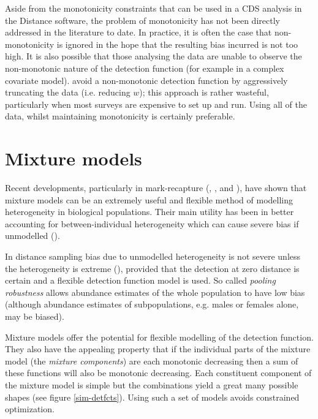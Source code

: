 \label{cor-7s14}Aside from the monotonicity constraints that can be used in a CDS analysis in the Distance software, the problem of monotonicity has not been directly addressed in the literature to date. In practice, it is often the case that non-monotonicity is ignored in the hope that the resulting bias incurred is not too high. It is also possible that those analysing the data are unable to observe the non-monotonic nature of the detection function (for example in a complex covariate model).  avoid a non-monotonic detection function by aggressively truncating the data (i.e. reducing $w$); this approach is rather wasteful, particularly when most surveys are expensive to set up and run. Using all of the data, whilst maintaining monotonicity is certainly preferable.

\section{Mixture models}

Recent developments, particularly in mark-recapture (\cite{pledger2000}, \cite{dorazio03}, \cite{pledger2005} and \cite{morgan08}), have shown that mixture models can be an extremely useful and flexible method of modelling heterogeneity in biological populations. Their main utility has been in better accounting for between-individual heterogeneity which can cause severe bias if unmodelled (\cite{Link2003}). 

In distance sampling bias due to unmodelled heterogeneity is not severe unless the heterogeneity is extreme (\cite[pp. 389-392]{ADS}), provided that the detection at zero distance is certain and a flexible detection function model is used. So called \textit{pooling robustness} allows abundance estimates of the whole population to have low bias (although abundance estimates of subpopulations, e.g. males or females alone, may be biased). 

Mixture models offer the potential for flexible modelling of the detection function. They also have the appealing property that if the individual parts of the mixture model (the \textit{mixture components}) are each monotonic decreasing then a sum of these functions will also be monotonic decreasing. Each constituent component of the mixture model is simple but the combinations yield a great many possible shapes (see figure \ref{sim-detfcts}). Using such a set of models avoids constrained optimization.


